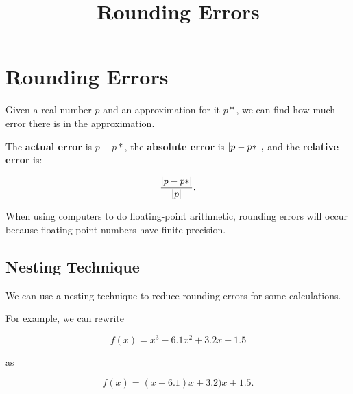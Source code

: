 \documentclass{article}
\title{Rounding Errors}
\begin{document}
\section{Rounding Errors}

Given a \@{real-number} $p$ and an approximation for it $p*$, we can find how much error there is in the approximation.

The \textbf{actual error} is $p - p*$, the \textbf{absolute error} is $\left| p - p* \right|,$ and the \textbf{relative error} is:

\[ \frac{\left| p - p* \right|}{\left| p \right|}. \]

When using computers to do floating-point arithmetic, rounding errors will occur because floating-point numbers have finite precision.

\subsection{Nesting Technique}

We can use a nesting technique to reduce rounding errors for some calculations.

For example, we can rewrite

\[ f(x) = x^3 - 6.1x^2 + 3.2x + 1.5 \]

as

\[ f(x) = (x - 6.1)x + 3.2)x + 1.5. \]
\end{document}

